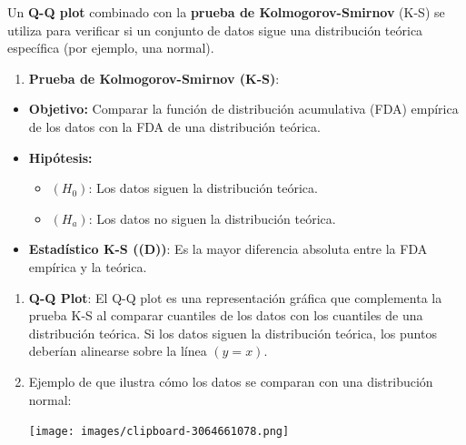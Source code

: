 \documentclass[
  us-letterpaper,
]{scrreprt}
\providecommand{\tightlist}{%
  \setlength{\itemsep}{0pt}\setlength{\parskip}{0pt}}\usepackage{longtable,booktabs,array}
\theoremstyle{plain}
\theoremstyle{plain}
\theoremstyle{definition}
\theoremstyle{remark}
\begin{document}
\begin{tcolorbox}[enhanced jigsaw, titlerule=0mm, opacityback=0, coltitle=black, bottomrule=.15mm, colbacktitle=quarto-callout-caution-color!10!white, toprule=.15mm, colback=white, arc=.35mm, colframe=quarto-callout-caution-color-frame, leftrule=.75mm, bottomtitle=1mm, left=2mm, toptitle=1mm, opacitybacktitle=0.6, breakable, title={Ejemplo (\textbf{\emph{Test KS}})}, rightrule=.15mm]

Un \textbf{Q-Q plot} combinado con la \textbf{prueba de
Kolmogorov-Smirnov} (K-S) se utiliza para verificar si un conjunto de
datos sigue una distribución teórica específica (por ejemplo, una
normal).

\begin{enumerate}
\def\labelenumi{\arabic{enumi}.}
\tightlist
\item
  \textbf{Prueba de Kolmogorov-Smirnov (K-S)}:
\end{enumerate}

\begin{itemize}
\tightlist
\item
  \textbf{Objetivo:} Comparar la función de distribución acumulativa
  (FDA) empírica de los datos con la FDA de una distribución teórica.
\item
  \textbf{Hipótesis:}

  \begin{itemize}
  \tightlist
  \item
    \((H_0)\): Los datos siguen la distribución teórica.
  \item
    \((H_a)\): Los datos no siguen la distribución teórica.
  \end{itemize}
\item
  \textbf{Estadístico K-S ((D))}: Es la mayor diferencia absoluta entre
  la FDA empírica y la teórica.
\end{itemize}

\begin{enumerate}
\def\labelenumi{\arabic{enumi}.}
\setcounter{enumi}{1}
\item
  \textbf{Q-Q Plot}: El Q-Q plot es una representación gráfica que
  complementa la prueba K-S al comparar cuantiles de los datos con los
  cuantiles de una distribución teórica. Si los datos siguen la
  distribución teórica, los puntos deberían alinearse sobre la línea
  \((y = x)\).
\item
  Ejemplo de que ilustra cómo los datos se comparan con una distribución
  normal:

  \begin{center}
  \texttt{[image: images/clipboard-3064661078.png]}
  \end{center}
\end{enumerate}


\end{tcolorbox}
\end{document}
